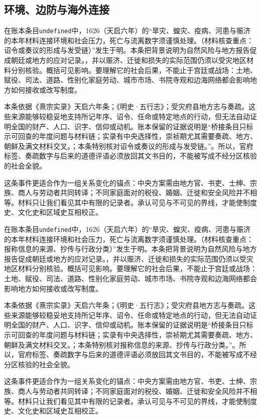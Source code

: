 \subsection{环境、边防与海外连接}

在账本条目\texttt{undefined}中，1626（天启六年）的“旱灾、蝗灾、疫病、河患与赈济的本年材料连接环境和社会压力，死亡与流离数字须谨慎处理。（材料核查重点：诏令或奏议的形成与发受链）”发生于明。本条把背景说明为自然风险与地方报告促成朝廷或地方的应对记录。，并以赈济、迁徙和损失的实际范围仍须以受灾地区材料分别核验。概括可见影响。要理解它的社会后果，不能止于宫廷或战场：土地、赋役、司法、道路、性别化家庭劳动、城市市场、书院寺观和边海网络都会影响地方如何接收或改写制度。

本条依据《熹宗实录》天启六年条；《明史·五行志》；受灾府县地方志与奏疏。这些来源能够较稳妥地支持所记年序、诏令、任命或特定地点的行动，但无法自动证明全国的财产、人口、识字、信仰或动机。账本保留的证据说明是“桥接条目只标示可回查的年度问题与材料链；实录有中央选择性，崇祯期尤其需要奏疏、地方、朝鲜及满文材料交叉。；本条特别核对诏令或奏议的形成与发受链。”。所以，官府标签、奏疏数字与后来的道德评语必须放回其文书目的，不能被写成不经分区核验的社会全貌。

这条事件更适合作为一组关系变化的锚点：中央方案需由地方官、书吏、士绅、宗族、商人与劳动者共同转译；不同家庭面对的税役、婚姻、迁徙和安全风险并不相等。材料只让我们看见其中有限的记录者。承认可见与不可见的界线，才能使制度史、文化史和区域史互相校正。

在账本条目\texttt{undefined}中，1626（天启六年）的“旱灾、蝗灾、疫病、河患与赈济的本年材料连接环境和社会压力，死亡与流离数字须谨慎处理。（材料核查重点：报称信息的来源、抄传与行政分类）”发生于明。本条把背景说明为自然风险与地方报告促成朝廷或地方的应对记录。，并以赈济、迁徙和损失的实际范围仍须以受灾地区材料分别核验。概括可见影响。要理解它的社会后果，不能止于宫廷或战场：土地、赋役、司法、道路、性别化家庭劳动、城市市场、书院寺观和边海网络都会影响地方如何接收或改写制度。

本条依据《熹宗实录》天启六年条；《明史·五行志》；受灾府县地方志与奏疏。这些来源能够较稳妥地支持所记年序、诏令、任命或特定地点的行动，但无法自动证明全国的财产、人口、识字、信仰或动机。账本保留的证据说明是“桥接条目只标示可回查的年度问题与材料链；实录有中央选择性，崇祯期尤其需要奏疏、地方、朝鲜及满文材料交叉。；本条特别核对报称信息的来源、抄传与行政分类。”。所以，官府标签、奏疏数字与后来的道德评语必须放回其文书目的，不能被写成不经分区核验的社会全貌。

这条事件更适合作为一组关系变化的锚点：中央方案需由地方官、书吏、士绅、宗族、商人与劳动者共同转译；不同家庭面对的税役、婚姻、迁徙和安全风险并不相等。材料只让我们看见其中有限的记录者。承认可见与不可见的界线，才能使制度史、文化史和区域史互相校正。

